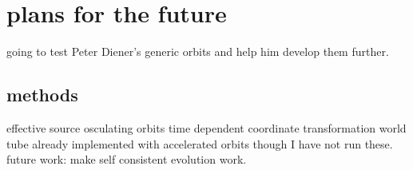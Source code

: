 \section{plans for the future}
going to test Peter Diener's generic orbits and help him develop them further.
\subsection{methods}
effective source
osculating orbits
time dependent coordinate transformation
world tube
already implemented with accelerated orbits though I have not run these.
future work: make self consistent evolution work. 
